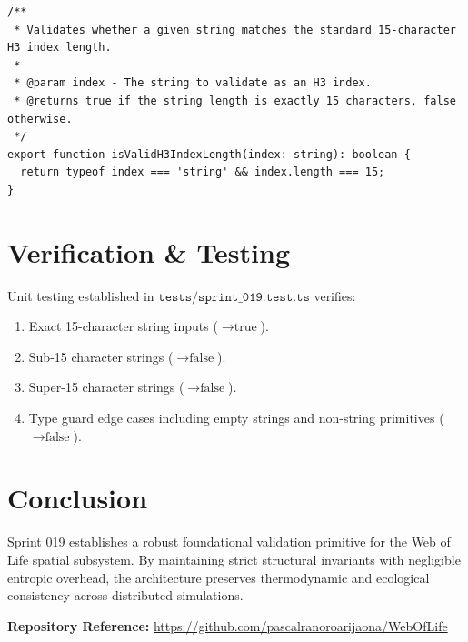 \documentclass[11pt, a4paper]{article}
\begin{document}
\begin{lstlisting}
/**
 * Validates whether a given string matches the standard 15-character H3 index length.
 * 
 * @param index - The string to validate as an H3 index.
 * @returns true if the string length is exactly 15 characters, false otherwise.
 */
export function isValidH3IndexLength(index: string): boolean {
  return typeof index === 'string' && index.length === 15;
}
\end{lstlisting}

\section{Verification \& Testing}
Unit testing established in $\texttt{tests/sprint\_019.test.ts}$ verifies:
\begin{enumerate}
    \item Exact 15-character string inputs ($\to \text{true}$).
    \item Sub-15 character strings ($\to \text{false}$).
    \item Super-15 character strings ($\to \text{false}$).
    \item Type guard edge cases including empty strings and non-string primitives ($\to \text{false}$).
\end{enumerate}

\section{Conclusion}
Sprint 019 establishes a robust foundational validation primitive for the Web of Life spatial subsystem. By maintaining strict structural invariants with negligible entropic overhead, the architecture preserves thermodynamic and ecological consistency across distributed simulations.

\vspace{0.5cm}
\noindent\textbf{Repository Reference:} \url{https://github.com/pascalranoroarijaona/WebOfLife}
\end{document}
